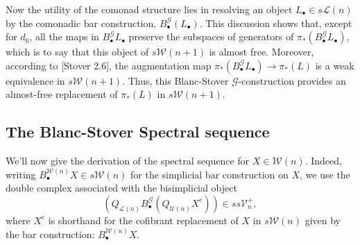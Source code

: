 \documentclass[11pt]{amsart}
\theoremstyle{plain}
\theoremstyle{definition}
\renewcommand{\to}{\longrightarrow}
\newcommand{\scrQ}{\mathscr{Q}}
\newcommand{\scrR}{\mathscr{R}}
\newcommand{\scrT}{\mathscr{T}}
\newcommand{\scrY}{\mathscr{Y}}
\newcommand{\scrI}{\mathscr{I}}
\newcommand{\scrO}{\mathscr{O}}
\newcommand{\scrP}{\mathscr{P}}
\newcommand{\scrS}{\mathscr{S}}
\newcommand{\scrG}{\mathscr{G}}
\newcommand{\scrH}{\mathscr{H}}
\newcommand{\scrJ}{\mathscr{J}}
\newcommand{\scrK}{\mathscr{K}}
\newcommand{\scrL}{\mathscr{L}}
\newcommand{\scrZ}{\mathscr{Z}}
\newcommand{\scrN}{\mathscr{N}}
\newcommand{\scrM}{\mathscr{M}}
\newcommand{\calW}{\mathcal{W}}
\newcommand{\calU}{\mathcal{U}}
\newcommand{\calL}{\mathcal{L}}
\newcommand{\calV}{\mathcal{V}}
\theoremstyle{plain}
\newcommand{\vect}[2]{\calV^{#1}_{#2}}
\newcommand{\BSW}{{\scrG}}%
\begin{document}
\begin{comp func sseq old version}
Now the utility of the comonad structure lies in resolving an object $L_\bullet\in s\calL(n)$ by the comonadic bar construction, $B^\BSW_\bullet(L_\bullet)$. This discussion shows that, except for $d_0$, all the maps in $B_\bullet^\BSW L_\bullet$ preserve the subspaces of generators of $\pi_*(B_\bullet^\BSW L_\bullet)$, which is to say that this object of $s\calW(n+1)$ is almost free. Moreover, according to [Stover 2.6], the augmentation map $\pi_*(B_\bullet^\BSW L_\bullet)\to \pi_*(L)$ is a weak equivalence in $s\calW(n+1)$. Thus, this Blanc-Stover $\BSW $-construction provides an almost-free replacement of $\pi_*(L)$ in $s\calW(n+1)$.
%
%
%
%
%
%
%
%
%


\subsection{The Blanc-Stover Spectral sequence}
We'll now give the derivation of the spectral sequence for $X\in\calW(n)$. Indeed, writing $B^{\calW(n)}_{\bullet}X\in s\calW(n)$ for the simplicial bar construction on $X$, we use the double complex associated with the bisimplicial object
\[(Q_{\calL(n)}B^\BSW_{\bullet}(Q_{\calU(n)}X^c))\in ss\vect{+}{n},\]
where $X^c$ is shorthand for the cofibrant replacement of $X$ in $s\calW(n)$ given by the bar construction: $B_\bullet^{\calW(n)}X$.










\end{comp func sseq old version}
\end{document}
